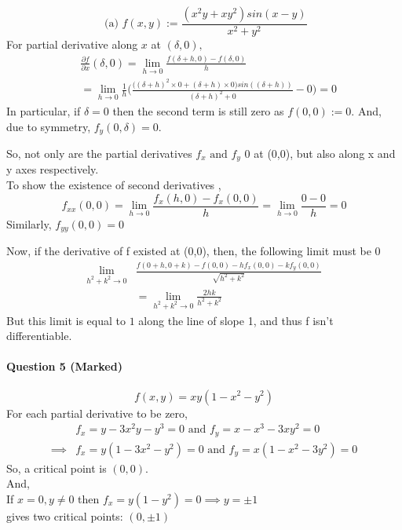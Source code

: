 \documentclass[20pt,a4paper]{extarticle} %
\theoremstyle{definition}
\theoremstyle{definition}
\begin{document}
\[ \text{ (a) } f(x,y):=\frac{(x^2y+xy^2)sin(x-y)}{x^2+y^2}\]
For partial derivative along $x$ at $(\delta,0),$
\begin{equation*}
	\begin{split}
		&\frac{\partial f}{\partial x}(\delta,0) =\lim_{h \to 0} \frac{f(\delta +h,0)-f(\delta,0)}{h}	\\
	&=\lim_{h \to 0} \frac{1}{h} \big(
		\frac{\big( (\delta+h)^2 \times 0 + (\delta+h) \times 0 \big) sin((\delta+h))}
								{(\delta+h)^2+0}
							- 0\big)=0
	\end{split}
\end{equation*}
In particular, if $\delta=0$ then the second term is still zero as $f(0,0):=0$.
And, due to symmetry, $f_y(0,\delta)=0$.

So, not only are the partial derivatives $f_x \text{ and } f_y$ 0 at (0,0), but also along x and y
axes respectively.\\
To show the existence of second derivatives ,
\begin{equation*}
	f_{xx}(0,0) = \lim_{h \to 0} \frac{f_x(h,0)-f_x(0,0)}{h}=\lim_{h \to 0} \frac{0-0}{h}=0
\end{equation*}
Similarly, $f_{yy}(0,0)=0$

Now, if the derivative of f existed at (0,0), then, the following limit must be 0
\begin{equation*}
	\begin{split}
		\lim_{h^2+k^2 \to 0}&\frac{f(0+h,0+k)-f(0,0) -hf_x(0,0)-kf_y(0,0)
		}{\sqrt{h^2+k^2}} \\
		&=\lim_{h^2+k^2 \to 0} \frac{2hk}{h^2+k^2}
	\end{split}
\end{equation*}
But this limit is equal to $1$ along the line of slope 1, and thus f isn't differentiable.


\newpage
\paragraph{Question 5 (Marked)}
\[ f(x,y)=xy(1-x^2-y^2) \]
For each partial derivative to be zero,
\begin{align*}
	& f_x=y-3x^2y-y^3=0 \text{ and }f_y=x-x^3-3xy^2=0 \\
	\implies & f_x=y(1-3x^2-y^2)=0 \text{ and } f_y=x(1-x^2-3y^2)=0
\end{align*}
So, a critical point is $(0,0)$.\\

And,\\
If $x=0,y\neq0$ then $f_x=y(1-y^2)=0 \implies y= \pm 1$\\
gives two critical points: $(0,\pm 1)$\\
\end{document}
